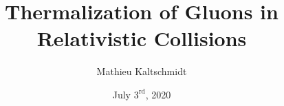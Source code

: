\title{Thermalization of Gluons in Relativistic Collisions}
\author{Mathieu Kaltschmidt}
\date{July $3^{\mathrm{rd}}$, 2020}

\usepackage{xcolor}


\usepackage{fancyhdr}
\fancyhfoffset{0pt}

\usepackage[a4paper,
			width = 150mm,
			top = 30mm,
		    bottom=30mm,
		    ]{geometry}
\usepackage[onehalfspacing]{setspace}


\makeatletter
\pagestyle{fancy}
\fancyhf{}
\fancyhead[L]{\footnotesize\nouppercase\leftmark}
\fancyhead[R]{\footnotesize\nouppercase\@title}
\fancyfoot[C]{\thepage}
\renewcommand{\headrulewidth}{0.2pt}
\renewcommand{\footrulewidth}{0pt}
\makeatother



\usepackage{amsmath, amssymb, commath, mathtools}
\usepackage{physics}
\usepackage{slashed}
\usepackage{xfrac}
\usepackage[separate-uncertainty]{siunitx}
\usepackage{relsize} %
\usepackage{bbm}
\usepackage{chngcntr}
\usepackage[amsmath,thmmarks,hyperref]{ntheorem}
\usepackage{ wasysym }

\theoremstyle{nonumberbreak}
\theoremseparator{} 
\theoremsymbol{\ensuremath{\square}}
\newtheorem{proof}{\textit{Proof.}}

\usepackage{array} %
\usepackage{booktabs} %

\usepackage{fontspec, xunicode}
\usepackage[utf8]{inputenc}
\usepackage{lmodern}
\setmainfont{Palatino}
\setsansfont{Optima}
\setmonofont[Scale=MatchLowercase]{Menlo}
\usepackage{polyglossia}
\setmainlanguage{english}
\usepackage{microtype}
\usepackage{scrextend} %
\usepackage{csquotes}
\usepackage{graphicx} %
\usepackage{float} %
\usepackage{blindtext} %
\usepackage[labelfont=bf]{caption} %
\usepackage{subcaption} %
\usepackage{tikz}
\usetikzlibrary{patterns, decorations.markings}
\usepackage{tcolorbox}

